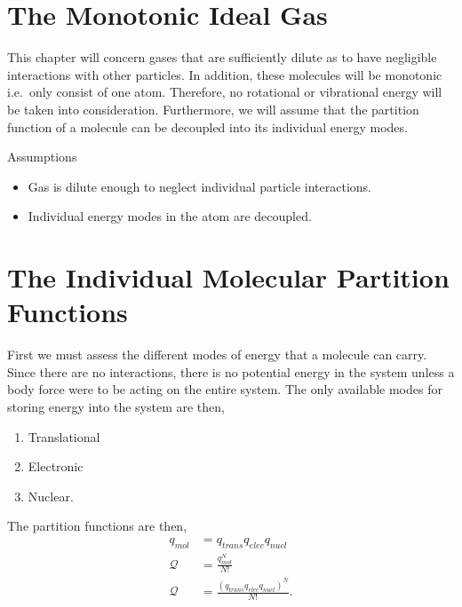 \section{The Monotonic Ideal Gas}%
\label{sec:MIG}
This chapter will concern gases that are sufficiently dilute as to have
negligible interactions with other particles. In addition, these molecules will
be monotonic i.e.\ only consist of one atom. Therefore, no rotational or
vibrational energy will be taken into consideration. Furthermore, we will assume
that the partition function of a molecule can be decoupled into its individual
energy modes.

Assumptions
\begin{itemize}
	\item Gas is dilute enough to neglect individual particle interactions.
	\item Individual energy modes in the atom are decoupled.
\end{itemize}
\section{The Individual Molecular Partition Functions}%
\label{sec:IMPF}
First we must assess the different modes of energy that a molecule can carry.
Since there are no interactions, there is no potential energy in the system
unless a body force were to be acting on the entire system. The only available
modes for storing energy into the system are then,
\begin{enumerate}
	\item Translational
	\item Electronic
	\item Nuclear.
\end{enumerate}
The partition functions are then,
\begin{align*}
	q_{mol} &= q_{trans}q_{elec}q_{nucl}\\
	\mathcal{Q} &= \frac{q_{mol}^N}{N!}\\
	\mathcal{Q} &= \frac{(q_{trans}q_{elec}q_{nucl})^N}{N!}.
\end{align*}

